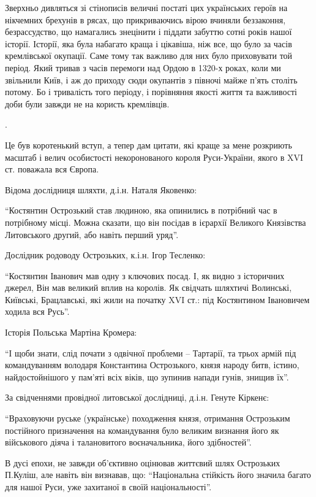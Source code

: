 Зверхньо дивляться зі стінописів величні постаті цих українських героїв на
нікчемних брехунів в рясах, що прикриваючись вірою вчиняли беззаконня,
безрассудство, що намагались знецінити і піддати забуттю сотні років нашої
історії. Історії, яка була набагато краща і цікавіша, ніж все, що було за часів
кремлівської окупації. Саме тому так важливо для них було приховувати той
період. Який тривав з часів перемоги над Ордою в 1320-х роках, коли ми
звільнили Київ, і аж до приходу сюди окупантів з півночі майже п’ять століть
потому. Бо і тривалість того періоду, і порівняння якості життя та важливості
доби були завжди не на користь кремлівців.

.

Це був коротенький вступ, а тепер дам цитати, які краще за мене розкриють
масштаб і велич особистості некоронованого короля Руси-України, якого в XVI ст.
поважала вся Європа.

Відома дослідниця шляхти, д.і.н. Наталя Яковенко:

\enquote{Костянтин Острозький став людиною, яка опинились в потрібний час в потрібному
місці. Можна сказати, що він посідав в ієрархії Великого Князівства Литовського
другий, або навіть перший уряд}.

Дослідник родоводу Острозьких, к.і.н. Ігор Тесленко:

\enquote{Костянтин Іванович мав одну з ключових посад. І, як видно з історичних джерел,
Він мав великий вплив на королів. Як свідчать шляхтичі Волинські, Київські,
Брацлавські, які жили на початку XVI ст.: під Костянтином Івановичем ходила вся
Русь}.

Історія Польська Мартіна Кромера:

\enquote{І щоби знати, слід почати з одвічної проблеми – Тартарії, та трьох армій під
командуванням володаря Константина Острозького, князя народу битв, істино,
найдостойнішого у пам’яті всіх віків, що зупинив напади гунів, знищив їх}.

За свідченнями провідної литовської дослідниці, д.і.н. Генуте Кіркенє: 

\enquote{Враховуючи руське (українське) походження князя, отримання Острозьким
постійного призначення на командування було великим визнання його як
військового діяча і талановитого воєначальника, його здібностей}.

В дусі епохи, не завжди об’єктивно оцінював життєвий шлях Острозьких П.Куліш,
але навіть він визнавав, що: \enquote{Національна стійкість його значила багато для
нашої Руси, уже захитаної в своїй національності}.

